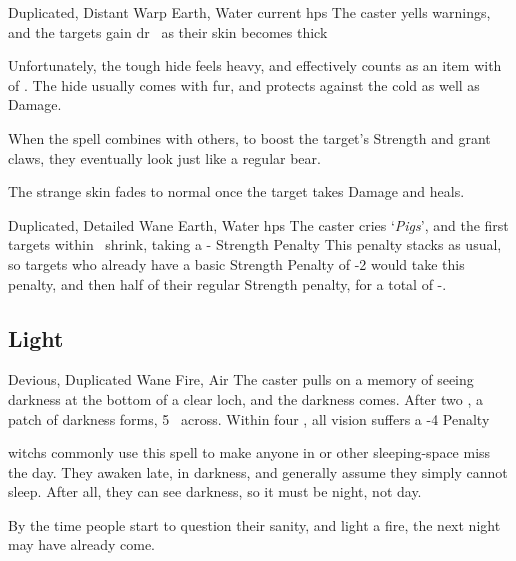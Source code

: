 \begin{multicols}{2}

  {Duplicated, Distant}%
  {Warp}%
  {Earth, Water}%
  {current \glspl{hp}}%
  {The caster yells warnings, and the targets gain \gls{dr}~ as their skin becomes thick}%
  {Unfortunately, the tough hide feels heavy, and effectively counts as an item with  of .
  The hide usually comes with fur, and protects against the cold as well as Damage.

  When the spell combines with others, to boost the target's Strength and grant claws, they eventually look just like a regular bear.

  The strange skin fades to normal once the target takes Damage and heals.}

\null

  {Duplicated, Detailed}%
  {Wane}%
  {Earth, Water}%
  {\glspl{hp}}%
  {The caster cries `\textit{Pigs}', and the first  targets within \spellRange\ shrink, taking a - Strength Penalty}%
  {
  This penalty stacks as usual, so targets who already have a basic Strength Penalty of -2 would take this penalty, and then half of their regular Strength penalty, for a total of -.}

\null

\subsection{Light}


  {Devious, Duplicated}%
  {Wane}%
  {Fire, Air}%
  {}%
  {The caster pulls on a memory of seeing darkness at the bottom of a clear loch, and the darkness comes.
  After two , a patch of darkness forms, 5~ across.
  Within four , all vision suffers a -4 Penalty}%
  {
  \Glspl{witch} commonly use this spell to make anyone in  or other sleeping-space miss the day.
  They awaken late, in darkness, and generally assume they simply cannot sleep.
  After all, they can see darkness, so it must be night, not day.

  By the time people start to question their sanity, and light a fire, the next night may have already come.
  }


\end{multicols}
